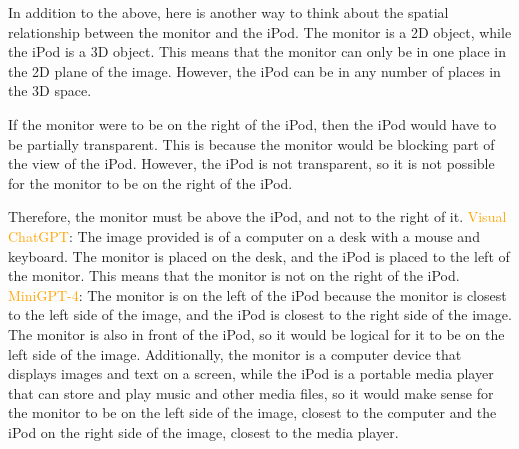 \begin{enumerate}
    In addition to the above, here is another way to think about the spatial relationship between the monitor and the iPod. The monitor is a 2D object, while the iPod is a 3D object. This means that the monitor can only be in one place in the 2D plane of the image. However, the iPod can be in any number of places in the 3D space.

    If the monitor were to be on the right of the iPod, then the iPod would have to be partially transparent. This is because the monitor would be blocking part of the view of the iPod. However, the iPod is not transparent, so it is not possible for the monitor to be on the right of the iPod.

    Therefore, the monitor must be above the iPod, and not to the right of it.
    \subitem \textcolor{orange}{Visual ChatGPT}: The image provided is of a computer on a desk with a mouse and keyboard. The monitor is placed on the desk, and the iPod is placed to the left of the monitor. This means that the monitor is not on the right of the iPod.
    \subitem \textcolor{orange}{MiniGPT-4}: The monitor is on the left of the iPod because the monitor is closest to the left side of the image, and the iPod is closest to the right side of the image. The monitor is also in front of the iPod, so it would be logical for it to be on the left side of the image. Additionally, the monitor is a computer device that displays images and text on a screen, while the iPod is a portable media player that can store and play music and other media files, so it would make sense for the monitor to be on the left side of the image, closest to the computer and the iPod on the right side of the image, closest to the media player.
\end{enumerate}

